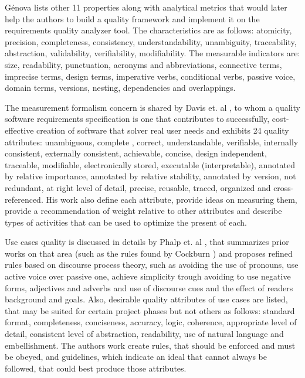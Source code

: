 G{\'e}nova \cite{Genova_2013} lists other 11 properties along with analytical metrics that would later help the authors to build a quality framework and implement it on the requirements quality analyzer tool. The characteristics are as follows: atomicity, precision, completeness, consistency, understandability, unambiguity, traceability, abstraction, validability, verifiability, modifiability. The measurable indicators are: size, readability, punctuation, acronyms and abbreviations, connective terms, imprecise terms, design terms, imperative verbs, conditional verbs, passive voice, domain terms, versions, nesting, dependencies and overlappings.

The measurement formalism concern is shared by Davis et. al \cite{Davis_1993}, to whom a quality software requirements specification is one that contributes to successfully, cost-effective creation of software that solver real user needs and exhibits 24 quality attributes: unambiguous, complete , correct, understandable, verifiable, internally consistent, externally consistent, achievable, concise, design independent, traceable, modifiable, electronically stored, executable (interpretable), annotated by relative importance, annotated by relative stability, annotated by version, not redundant, at right level of detail, precise, reusable, traced, organized and cross-referenced. His work also define each attribute, provide ideas on measuring them, provide a recommendation of weight relative to other attributes and describe types of activities that can be used to optimize the present of each.

Use cases quality is discussed in details by Phalp et. al \cite{Phalp_et_dot_al_2011}, that summarizes prior works on that area (such as the rules found by Cockburn \cite{Cockburn_2000}) and proposes refined rules based on discourse process theory, such as avoiding the use of pronouns, use active voice over passive one, achieve simplicity trough avoiding to use negative forms, adjectives and adverbs and use of discourse cues and the effect of readers background and goals. Also, desirable quality attributes of use cases are listed, that may be suited for certain project phases but not others as follows: standard format, completeness, conciseness, accuracy, logic, coherence, appropriate level of detail, consistent level of abstraction, readability, use of natural language and embellishment. The authors work create rules, that should be enforced and must be obeyed, and guidelines, which indicate an ideal that cannot always be followed, that could best produce those attributes. 

